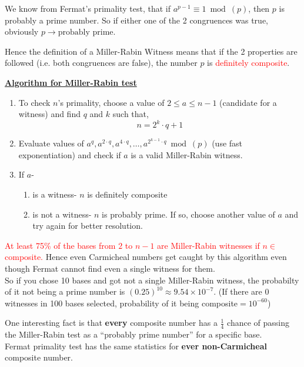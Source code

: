			\begin{tcolorbox}[title=Digesting the meaning of witness here]
				We know from Fermat's primality test, that if \(a^{p-1}\equiv 1 \bmod(p)\), then \(p\) is probably a prime number. So if either one of the 2 congruences was true, obviously \(p\rightarrow \text{probably prime}\). \par

				Hence the definition of a Miller-Rabin Witness means that if the 2 properties are followed (i.e. both congruences are false), the number \(p\) is \textcolor{red}{definitely composite}.
			\end{tcolorbox}

			\underline{\textbf{Algorithm for Miller-Rabin test}}
			\begin{enumerate}
				\item To check \(n\)'s primality, choose a value of \(2\leq a\leq n-1 \) (candidate for a witness) and find \(q\) and \(k\) such that, \[n=2^k\cdot q +1\] 
				\item Evaluate values of \(a^q, a^{2\cdot q}, a^{4\cdot q},\ldots, a^{2^{k-1}\cdot q} \bmod(p)\) (use fast exponentiation) and check if \(a\) is a valid Miller-Rabin witness.
				\item If \(a\)-
					\begin{enumerate}
						\item is a witness- \(n\) is definitely composite
						\item is not a witness- \(n\) is probably prime. If so, choose another value of \(a\) and try again for better resolution. 
					\end{enumerate}
			\end{enumerate}

			\Large \centering{\textcolor{orange}{But what makes Miller-Rabin test better than Fermat test?}}

			\normalsize\raggedright \textcolor{red}{At least 75\% of the bases from \(2\) to \(n-1\) are Miller-Rabin witnesses if \(n\in\) composite.} Hence even Carmicheal numbers get caught by this algorithm even though Fermat cannot find even a single witness for them. \\So if you chose 10 bases and got not a single Miller-Rabin witness, the probabilty of it not being a prime number is \((0.25)^{10}\approx9.54\times 10^{-7}\). (If there are 0 witnesses in 100 bases selected, probability of it being composite\(=10^{-60}\))

			\begin{mybox}
				One interesting fact is that \textbf{every} composite number has a \(\frac14\) chance of passing the Miller-Rabin test as a ``probably prime number'' for a specific base.\\
				Fermat primality test has the same statistics for \textbf{ever non-Carmicheal} composite number.
			\end{mybox}

